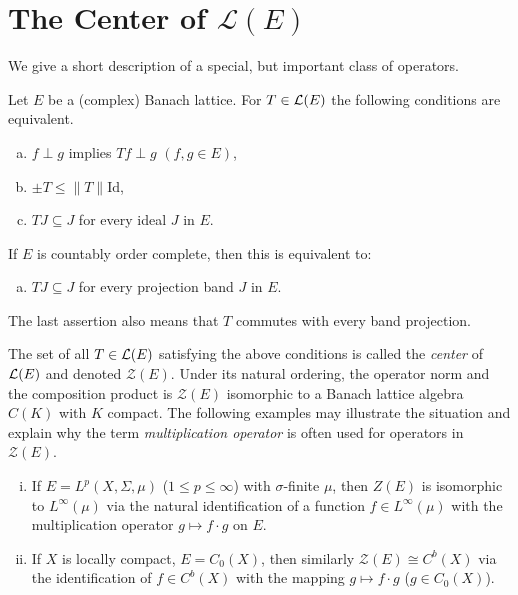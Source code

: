 \section{The Center of $\mathcal{L}(E)$}\label{sec:c1-9}
We give a short description of a special, but important class of operators.

Let $ E $ be a (complex) Banach lattice.
For $ T \in \mathcal{L}(E) $ the following conditions are equivalent.
\begin{enumerate}[(a)]

    \item 
    $ f \perp g $ implies $ Tf \perp g $ \quad $(f, g \in E)$,
    
    \item 
    $ \pm T \leq \|T\|\text{Id}$,
    
    \item 
    $ TJ \subseteq J $ for every ideal $ J $ in $ E $.
    
\end{enumerate}
If $ E $ is countably order complete, then this is equivalent to:
\begin{enumerate}[(a), resume]
    \item 
    $ TJ \subseteq J $ for every projection band $ J $ in $ E $.
\end{enumerate}
The last assertion also means that $ T $ commutes with every band projection.

The set of all $ T \in \mathcal{L}(E) $ satisfying the above conditions is called the \emph{center} of $ \mathcal{L}(E) $ and denoted $ \mathcal{Z}(E) $.
Under its natural ordering, the operator norm and the composition product is $ \mathcal{Z}(E) $ isomorphic to a Banach lattice algebra $ C(K) $ with $ K $ compact.
The following examples may illustrate the situation and explain why the term \emph{multiplication operator} is often used for operators in $ \mathcal{Z}(E) $.
\begin{enumerate}[(i)]
\item 
If $ E = L^{p}(X,\Sigma,\mu) $ ($ 1 \leq p \leq \infty $) with $ \sigma $-finite $ \mu $, then $ Z(E) $ is isomorphic to $ L^{\infty}(\mu) $ via the natural identification of a function $ f \in L^{\infty}(\mu) $ with the multiplication operator $ g \mapsto f\cdot g $ on $ E $. 

\item 
If $ X $ is locally compact, $ E = C_{0}(X) $, then similarly $ \mathcal{Z}(E) \cong C^{b}(X) $ via the identification of $ f \in C^{b}(X) $ with the mapping $ g \mapsto f\cdot g $ ($ g \in C_{0}(X) $).
\end{enumerate}

\RaggedRight



%